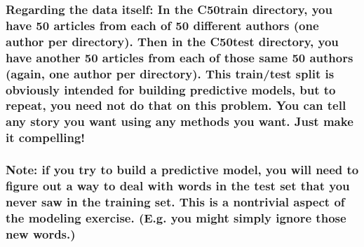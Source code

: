 \documentclass[
  12pt,
]{article}
\begin{document}
\hypertarget{regarding-the-data-itself-in-the-c50train-directory-you-have-50-articles-from-each-of-50-different-authors-one-author-per-directory.-then-in-the-c50test-directory-you-have-another-50-articles-from-each-of-those-same-50-authors-again-one-author-per-directory.-this-traintest-split-is-obviously-intended-for-building-predictive-models-but-to-repeat-you-need-not-do-that-on-this-problem.-you-can-tell-any-story-you-want-using-any-methods-you-want.-just-make-it-compelling}{%
\subsubsection{Regarding the data itself: In the C50train directory, you
have 50 articles from each of 50 different authors (one author per
directory). Then in the C50test directory, you have another 50 articles
from each of those same 50 authors (again, one author per directory).
This train/test split is obviously intended for building predictive
models, but to repeat, you need not do that on this problem. You can
tell any story you want using any methods you want. Just make it
compelling!}\label{regarding-the-data-itself-in-the-c50train-directory-you-have-50-articles-from-each-of-50-different-authors-one-author-per-directory.-then-in-the-c50test-directory-you-have-another-50-articles-from-each-of-those-same-50-authors-again-one-author-per-directory.-this-traintest-split-is-obviously-intended-for-building-predictive-models-but-to-repeat-you-need-not-do-that-on-this-problem.-you-can-tell-any-story-you-want-using-any-methods-you-want.-just-make-it-compelling}}

\hypertarget{note-if-you-try-to-build-a-predictive-model-you-will-need-to-figure-out-a-way-to-deal-with-words-in-the-test-set-that-you-never-saw-in-the-training-set.-this-is-a-nontrivial-aspect-of-the-modeling-exercise.-e.g.-you-might-simply-ignore-those-new-words.}{%
\subsubsection{Note: if you try to build a predictive model, you will
need to figure out a way to deal with words in the test set that you
never saw in the training set. This is a nontrivial aspect of the
modeling exercise. (E.g. you might simply ignore those new
words.)}\label{note-if-you-try-to-build-a-predictive-model-you-will-need-to-figure-out-a-way-to-deal-with-words-in-the-test-set-that-you-never-saw-in-the-training-set.-this-is-a-nontrivial-aspect-of-the-modeling-exercise.-e.g.-you-might-simply-ignore-those-new-words.}}
\end{document}
